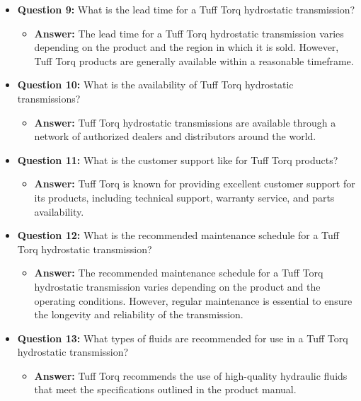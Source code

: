 \documentclass{article}
\begin{document}
\begin{itemize}
    \item \textbf{Question 9:} What is the lead time for a Tuff Torq hydrostatic transmission?
    \begin{itemize}
        \item \textbf{Answer:} The lead time for a Tuff Torq hydrostatic transmission varies depending on the product and the region in which it is sold. However, Tuff Torq products are generally available within a reasonable timeframe.
    \end{itemize}
    
    \item \textbf{Question 10:} What is the availability of Tuff Torq hydrostatic transmissions?
    \begin{itemize}
        \item \textbf{Answer:} Tuff Torq hydrostatic transmissions are available through a network of authorized dealers and distributors around the world.
    \end{itemize}
    
    \item \textbf{Question 11:} What is the customer support like for Tuff Torq products?
    \begin{itemize}
        \item \textbf{Answer:} Tuff Torq is known for providing excellent customer support for its products, including technical support, warranty service, and parts availability.
    \end{itemize}
    
    \item \textbf{Question 12:} What is the recommended maintenance schedule for a Tuff Torq hydrostatic transmission?
    \begin{itemize}
        \item \textbf{Answer:} The recommended maintenance schedule for a Tuff Torq hydrostatic transmission varies depending on the product and the operating conditions. However, regular maintenance is essential to ensure the longevity and reliability of the transmission.
    \end{itemize}
    
    \item \textbf{Question 13:} What types of fluids are recommended for use in a Tuff Torq hydrostatic transmission?
    \begin{itemize}
        \item \textbf{Answer:} Tuff Torq recommends the use of high-quality hydraulic fluids that meet the specifications outlined in the product manual.
    \end{itemize}
    

\end{itemize}
\end{document}
